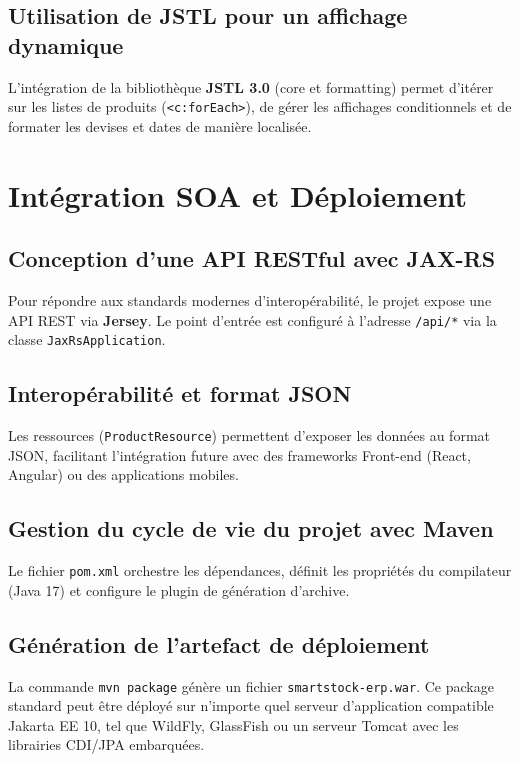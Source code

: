 \documentclass[12pt,a4paper]{report}
\begin{document}
\section{Utilisation de JSTL pour un affichage dynamique}
L'intégration de la bibliothèque \textbf{JSTL 3.0} (core et formatting) permet d'itérer sur les listes de produits (\texttt{<c:forEach>}), de gérer les affichages conditionnels et de formater les devises et dates de manière localisée.

\chapter{Intégration SOA et Déploiement}

\section{Conception d'une API RESTful avec JAX-RS}
Pour répondre aux standards modernes d'interopérabilité, le projet expose une API REST via \textbf{Jersey}. Le point d'entrée est configuré à l'adresse \texttt{/api/*} via la classe \texttt{JaxRsApplication}.

\section{Interopérabilité et format JSON}
Les ressources (\texttt{ProductResource}) permettent d'exposer les données au format JSON, facilitant l'intégration future avec des frameworks Front-end (React, Angular) ou des applications mobiles.

\section{Gestion du cycle de vie du projet avec Maven}
Le fichier \texttt{pom.xml} orchestre les dépendances, définit les propriétés du compilateur (Java 17) et configure le plugin de génération d'archive.

\section{Génération de l'artefact de déploiement}
La commande \texttt{mvn package} génère un fichier \texttt{smartstock-erp.war}. Ce package standard peut être déployé sur n'importe quel serveur d'application compatible Jakarta EE 10, tel que WildFly, GlassFish ou un serveur Tomcat avec les librairies CDI/JPA embarquées.
\end{document}
